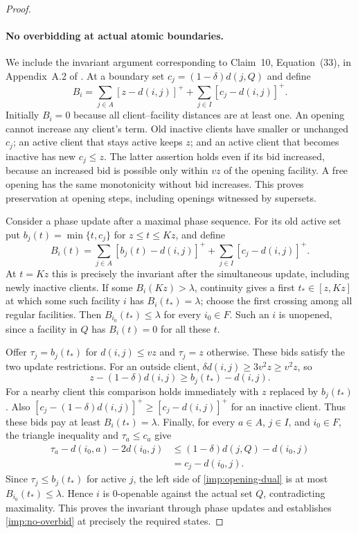 \begin{proof}
\paragraph{No overbidding at actual atomic boundaries.}
We include the invariant argument corresponding to Claim~10,
Equation~(33), in Appendix~A.2 of \cite{CGLSS2026}.  At a boundary set
$c_j=(1-\delta)d(j,Q)$ and define
\[
 B_i=\sum_{j\in A}[z-d(i,j)]^+
          +\sum_{j\in I}[c_j-d(i,j)]^+.
\]
Initially $B_i=0$ because all client--facility distances are at
least one.  An opening cannot increase any client's term.
Old inactive clients have smaller or unchanged $c_j$; an active
client that stays active keeps $z$; and an active client that becomes
inactive has new $c_j\le z$.  The latter assertion holds even if its
bid increased, because an increased bid is possible only within
$vz$ of the opening facility.  A free opening has the same
monotonicity without bid increases.  This proves preservation at
opening steps, including openings witnessed by supersets.

Consider a phase update after a maximal phase sequence.  For its old
active set put $b_j(t)=\min\{t,c_j\}$ for $z\le t\le Kz$, and define
\[
 B_i(t)=\sum_{j\in A}[b_j(t)-d(i,j)]^+
             +\sum_{j\in I}[c_j-d(i,j)]^+.
\]
At $t=Kz$ this is precisely the invariant after the simultaneous
update, including newly inactive clients.  If some $B_i(Kz)>\lambda$,
continuity gives a first $t_*\in[z,Kz]$ at which some such facility
$i$ has $B_i(t_*)=\lambda$; choose the first crossing among all
regular facilities.  Then $B_{i_0}(t_*)\le\lambda$ for every
$i_0\in F$.  Such an $i$ is unopened, since a facility in $Q$ has
$B_i(t)=0$ for all these $t$.

Offer $\tau_j=b_j(t_*)$ for $d(i,j)\le vz$ and $\tau_j=z$
otherwise.  These bids satisfy the two update restrictions.
For an outside client, $\delta d(i,j)\ge3v^2z\ge v^2z$, so
\[
 z-(1-\delta)d(i,j)\ge b_j(t_*)-d(i,j).
\]
For a nearby client this comparison holds immediately with
$z$ replaced by $b_j(t_*)$.  Also
$[c_j-(1-\delta)d(i,j)]^+\ge[c_j-d(i,j)]^+$ for an inactive client.
Thus these bids pay at least $B_i(t_*)=\lambda$.
Finally, for every $a\in A$, $j\in I$, and $i_0\in F$,
the triangle inequality and $\tau_a\le c_a$ give
\begin{align*}
 \tau_a-d(i_0,a)-2d(i_0,j)
 &\le (1-\delta)d(j,Q)-d(i_0,j)\\
 &=c_j-d(i_0,j).
\end{align*}
Since $\tau_j\le b_j(t_*)$ for active $j$, the left side of
\eqref{imp:opening-dual} is at most $B_{i_0}(t_*)\le\lambda$.
Hence $i$ is $0$-openable against the actual set $Q$, contradicting
maximality.  This proves the invariant through phase updates and
establishes \eqref{imp:no-overbid} at precisely the required states.


\end{proof}
